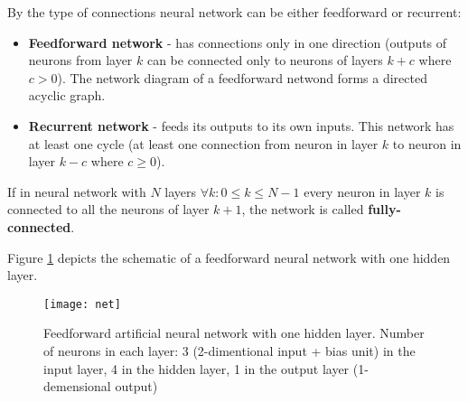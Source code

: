 By the type of connections neural network can be either feedforward or recurrent:
\begin{itemize}
  \item \textbf{Feedforward network} - has connections only in one direction (outputs of neurons from layer $ k $ can be connected only to neurons of layers $ k + c $ where $ c > 0 $). The network diagram of a feedforward netwond forms a directed acyclic graph.
  \item \textbf{Recurrent network} - feeds its outputs to its own inputs. This network has at least one cycle (at least one connection from neuron in layer $ k $ to neuron in layer $ k - c $ where $ c \geq 0 $). 
\end{itemize}
  
If in neural network with $ N $ layers $ \forall k:0 \leq k \leq N-1  $ every neuron in layer $ k $ is connected to all the neurons of layer $ k+1 $, the network is called \textbf{fully-connected}.
  
Figure \ref{fig:net} depicts the schematic of a feedforward neural network with one hidden layer.
  
\begin{figure}[H]
  \centering
  \texttt{[image: net]}
  \caption[Feedforward artificial neural network]{Feedforward artificial neural network with one hidden layer. Number of neurons in each layer: 3 (2-dimentional input + bias unit) in the input layer, 4 in the hidden layer, 1 in the output layer (1-demensional output)\footnotemark}
  \label{fig:net}
\end{figure}

